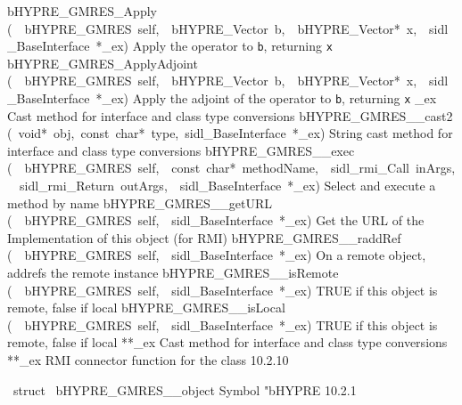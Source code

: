 \documentclass{article}
\begin{document}
\begin{cxxentry}
\begin{cxxentry}
\begin{cxxnames}
        {bHYPRE\_GMRES\_Apply}
        {(\ \ bHYPRE\_GMRES\ self,\ \ bHYPRE\_Vector\ b,\ \ bHYPRE\_Vector*\ x,\ \ sidl\_BaseInterface\ *\_ex)}
        {
Apply the operator to {\tt b}, returning {\tt x}}
        {}
\label{cxx.10.2.30}
        {bHYPRE\_GMRES\_ApplyAdjoint}
        {(\ \ bHYPRE\_GMRES\ self,\ \ bHYPRE\_Vector\ b,\ \ bHYPRE\_Vector*\ x,\ \ sidl\_BaseInterface\ *\_ex)}
        {
Apply the adjoint of the operator to {\tt b}, returning {\tt x}}
        {}
\label{cxx.10.2.31}
        {\_ex}
        {}
        {
Cast method for interface and class type conversions}
        {}
\label{cxx.10.2.32}
        {bHYPRE\_GMRES\_\_cast2}
        {(\ void*\ obj,\ const\ char*\ type,\ sidl\_BaseInterface\ *\_ex)}
        {
String cast method for interface and class type conversions}
        {}
\label{cxx.10.2.33}
        {bHYPRE\_GMRES\_\_exec}
        {(\ \ bHYPRE\_GMRES\ self,\ \ const\ char*\ methodName,\ \ sidl\_rmi\_Call\ inArgs,\ \ sidl\_rmi\_Return\ outArgs,\ \ sidl\_BaseInterface\ *\_ex)}
        {
Select and execute a method by name}
        {}
\label{cxx.10.2.34}
        {bHYPRE\_GMRES\_\_getURL}
        {(\ \ bHYPRE\_GMRES\ self,\ \ sidl\_BaseInterface\ *\_ex)}
        {
Get the URL of the Implementation of this object (for RMI)}
        {}
\label{cxx.10.2.35}
        {bHYPRE\_GMRES\_\_raddRef}
        {(\ \ bHYPRE\_GMRES\ self,\ \ sidl\_BaseInterface\ *\_ex)}
        {
On a remote object, addrefs the remote instance}
        {}
\label{cxx.10.2.36}
        {bHYPRE\_GMRES\_\_isRemote}
        {(\ \ bHYPRE\_GMRES\ self,\ \ sidl\_BaseInterface\ *\_ex)}
        {
TRUE if this object is remote, false if local}
        {}
\label{cxx.10.2.37}
        {bHYPRE\_GMRES\_\_isLocal}
        {(\ \ bHYPRE\_GMRES\ self,\ \ sidl\_BaseInterface\ *\_ex)}
        {
TRUE if this object is remote, false if local}
        {}
\label{cxx.10.2.38}
        {**\_ex}
        {}
        {
Cast method for interface and class type conversions}
        {}
\label{cxx.10.2.39}
        {**\_ex}
        {}
        {
RMI connector function for the class}
        {10.2.10}
\end{cxxnames}
\begin{cxxvariable}
{\ struct\ }
        {bHYPRE\_GMRES\_\_object}
        {}
        {
Symbol "bHYPRE}
        {10.2.1}
\begin{cxxdoc}


\end{cxxdoc}
\end{cxxvariable}
\end{cxxentry}
\end{cxxentry}
\end{document}
